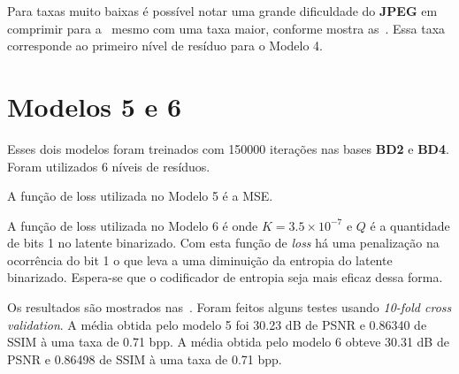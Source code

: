 Para taxas muito baixas é possível notar uma grande dificuldade do \textbf{JPEG} em comprimir para a~ mesmo com uma taxa maior, conforme mostra as~. Essa taxa corresponde ao primeiro nível de resíduo para o Modelo 4.

\section{Modelos 5 e 6}
\label{res:6levels}
Esses dois modelos foram treinados com 150000 iterações nas bases \textbf{BD2} e \textbf{BD4}. Foram utilizados 6 níveis de resíduos. 

A função de loss utilizada no Modelo 5 é a \acrshort{MSE}. 

A função de loss utilizada no Modelo 6 é  onde $K = 3.5 \times 10^{-7}$ e $Q$ é a quantidade de bits 1 no latente binarizado. Com esta função de \textit{loss} há uma penalização na ocorrência do bit 1 o que leva a uma diminuição da entropia do latente binarizado. Espera-se que o codificador de entropia seja mais eficaz dessa forma.

Os resultados são mostrados nas~. Foram feitos alguns testes usando \textit{10-fold cross validation}. A média obtida pelo modelo 5 foi 30.23 dB de \acrshort{PSNR} e 0.86340 de \acrshort{SSIM} à uma taxa de 0.71 bpp. A média obtida pelo modelo 6 obteve 30.31 dB de \acrshort{PSNR} e 0.86498 de \acrshort{SSIM} à uma taxa de 0.71 bpp.


